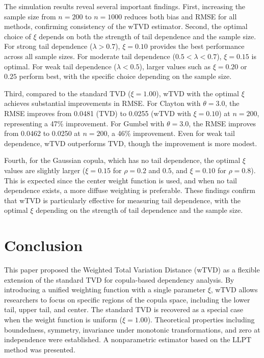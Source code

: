 \documentclass[twoside]{article}
\begin{document}
The simulation results reveal several important findings. First, increasing the sample size from $n = 200$ to $n = 1000$ reduces both bias and RMSE for all methods, confirming consistency of the wTVD estimator. Second, the optimal choice of $\xi$ depends on both the strength of tail dependence and the sample size. For strong tail dependence ($\lambda > 0.7$), $\xi = 0.10$ provides the best performance across all sample sizes. For moderate tail dependence ($0.5 < \lambda < 0.7$), $\xi = 0.15$ is optimal. For weak tail dependence ($\lambda < 0.5$), larger values such as $\xi = 0.20$ or $0.25$ perform best, with the specific choice depending on the sample size.

Third, compared to the standard TVD ($\xi = 1.00$), wTVD with the optimal $\xi$ achieves substantial improvements in RMSE. For Clayton with $\theta = 3.0$, the RMSE improves from 0.0481 (TVD) to 0.0255 (wTVD with $\xi = 0.10$) at $n = 200$, representing a 47\% improvement. For Gumbel with $\theta = 3.0$, the RMSE improves from 0.0462 to 0.0250 at $n = 200$, a 46\% improvement. Even for weak tail dependence, wTVD outperforms TVD, though the improvement is more modest.

Fourth, for the Gaussian copula, which has no tail dependence, the optimal $\xi$ values are slightly larger ($\xi = 0.15$ for $\rho = 0.2$ and $0.5$, and $\xi = 0.10$ for $\rho = 0.8$). This is expected since the center weight function is used, and when no tail dependence exists, a more diffuse weighting is preferable. These findings confirm that wTVD is particularly effective for measuring tail dependence, with the optimal $\xi$ depending on the strength of tail dependence and the sample size.




\section*{Conclusion}

This paper proposed the Weighted Total Variation Distance (wTVD) as a flexible extension of the standard TVD for copula-based dependency analysis. By introducing a unified weighting function with a single parameter $\xi$, wTVD allows researchers to focus on specific regions of the copula space, including the lower tail, upper tail, and center. The standard TVD is recovered as a special case when the weight function is uniform ($\xi = 1.00$). Theoretical properties including boundedness, symmetry, invariance under monotonic transformations, and zero at independence were established. A nonparametric estimator based on the LLPT method was presented.
\end{document}
